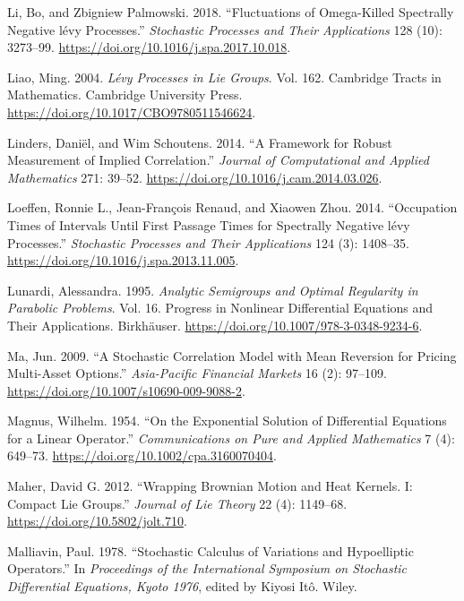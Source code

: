 \documentclass[
  english,
  11pt,
  letterpaper,
  DIV=11,
  numbers=noendperiod]{scrartcl}
\newlength{\cslhangindent}
\newenvironment{CSLReferences}[2] %
 {\begin{list}{}{%
  \setlength{\itemindent}{0pt}
  \setlength{\leftmargin}{0pt}
  \setlength{\parsep}{0pt}
  \ifodd #1
   \setlength{\leftmargin}{\cslhangindent}
   \setlength{\itemindent}{-1\cslhangindent}
  \fi
  \setlength{\itemsep}{#2\baselineskip}}}
 {\end{list}}
\theoremstyle{plain}
\theoremstyle{plain}
\theoremstyle{plain}
\theoremstyle{plain}
\theoremstyle{remark}
\begin{document}
\begin{CSLReferences}{1}{1}
Li, Bo, and Zbigniew Palmowski. 2018. {``Fluctuations of Omega-Killed
Spectrally Negative l{é}vy Processes.''} \emph{Stochastic Processes and
Their Applications} 128 (10): 3273--99.
\url{https://doi.org/10.1016/j.spa.2017.10.018}.

Liao, Ming. 2004. \emph{L{é}vy Processes in Lie Groups}. Vol. 162.
Cambridge Tracts in Mathematics. Cambridge University Press.
\url{https://doi.org/10.1017/CBO9780511546624}.

Linders, Daniël, and Wim Schoutens. 2014. {``A Framework for Robust
Measurement of Implied Correlation.''} \emph{Journal of Computational
and Applied Mathematics} 271: 39--52.
\url{https://doi.org/10.1016/j.cam.2014.03.026}.

Loeffen, Ronnie L., Jean-François Renaud, and Xiaowen Zhou. 2014.
{``Occupation Times of Intervals Until First Passage Times for
Spectrally Negative l{é}vy Processes.''} \emph{Stochastic Processes and
Their Applications} 124 (3): 1408--35.
\url{https://doi.org/10.1016/j.spa.2013.11.005}.

Lunardi, Alessandra. 1995. \emph{Analytic Semigroups and Optimal
Regularity in Parabolic Problems}. Vol. 16. Progress in Nonlinear
Differential Equations and Their Applications. Birkh{ä}user.
\url{https://doi.org/10.1007/978-3-0348-9234-6}.

Ma, Jun. 2009. {``A Stochastic Correlation Model with Mean Reversion for
Pricing Multi-Asset Options.''} \emph{Asia-Pacific Financial Markets} 16
(2): 97--109. \url{https://doi.org/10.1007/s10690-009-9088-2}.

Magnus, Wilhelm. 1954. {``On the Exponential Solution of Differential
Equations for a Linear Operator.''} \emph{Communications on Pure and
Applied Mathematics} 7 (4): 649--73.
\url{https://doi.org/10.1002/cpa.3160070404}.

Maher, David G. 2012. {``Wrapping Brownian Motion and Heat Kernels. I:
Compact Lie Groups.''} \emph{Journal of Lie Theory} 22 (4): 1149--68.
\url{https://doi.org/10.5802/jolt.710}.

Malliavin, Paul. 1978. {``Stochastic Calculus of Variations and
Hypoelliptic Operators.''} In \emph{Proceedings of the International
Symposium on Stochastic Differential Equations, Kyoto 1976}, edited by
Kiyosi Itô. Wiley.


\end{CSLReferences}
\end{document}
